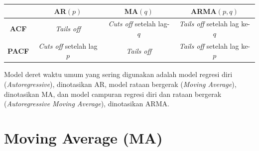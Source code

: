 \documentclass[
]{book}
\begin{document}
\begin{center}
\begin{tabular}{|c|c|c|c|}
\hline
&AR$(p)$&MA$(q)$& ARMA$(p,q)$ \\ \hline
\textbf{ACF} &\textit{Tails off}&   \textit{Cuts off} setelah lag-$q$&  \textit{Tails off} setelah lag ke-$q$ \\ \hline 
\textbf{PACF}& \textit{Cuts off} setelah lag $p$    &\textit{Tails off} & \textit{Tails off} setelah lag ke-$p$\\ \hline
\end{tabular}
\end{center}

Model deret waktu umum yang sering digunakan adalah model regresi diri (\emph{Autoregressive}), dinotasikan AR, model rataan bergerak (\emph{Moving Average}), dinotasikan MA, dan model campuran regresi diri dan rataan bergerak (\emph{Autoregressive Moving Average}), dinotasikan ARMA.

\hypertarget{moving-average-ma}{%
\section{Moving Average (MA)}\label{moving-average-ma}}
\end{document}
